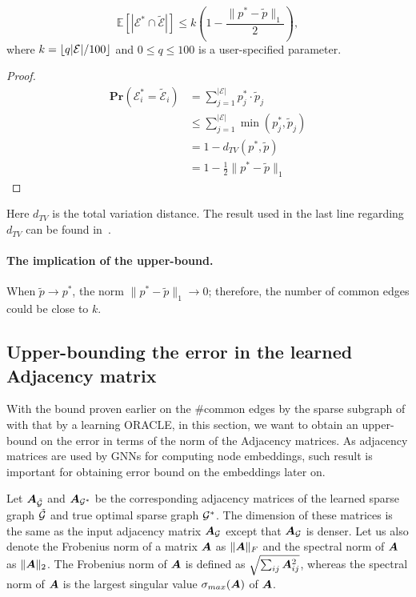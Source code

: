 \begin{theorem}
\begin{equation}
\mathbb{E}[|\mathcal{E}^* \cap \mathcal{\tilde{E}}|] \leq k (1 - \frac{\|p^* - \tilde{p}\|_1}{2}), 
\end{equation}
where $k = \lfloor q|\mathcal{E}|/100 \rfloor$ and $0 \leq q \leq 100$ is a user-specified parameter.
\end{theorem}
\begin{proof}
\begin{align*}
    \mathbf{Pr}(\mathcal{E}_i^* = \mathcal{\tilde{E}}_i) &= \sum_{j=1}^{|\mathcal{E}|} p^*_j \cdot \tilde{p}_j \\
    & \leq \sum_{j=1}^{|\mathcal{E}|} \min(p^*_j,\tilde{p}_j) \\
    &= 1 - d_{TV}(p^*,\tilde{p}) \\
    &= 1 - \frac{1}{2} \|p^* - \tilde{p}\|_1    
\end{align*}
\end{proof}
Here $d_{TV}$ is the total variation distance. The result used in the last line regarding $d_{TV}$ can be found in~\citet{xie2024distributionally}. 

\paragraph{The implication of the upper-bound.} 
When $\tilde{p} \rightarrow p^*$, the norm $\|p^* - \tilde{p}\|_1 \rightarrow 0$; therefore, the number of common edges could be close to $k$.

\subsection{Upper-bounding the error in the learned Adjacency matrix} 
With the bound proven earlier on the \#common edges by the sparse subgraph of \sgs with that by a learning ORACLE, in this section, we want to obtain an upper-bound on the error in terms of the norm of the Adjacency matrices. As adjacency matrices are used by GNNs for computing node embeddings, such result is important for obtaining error bound on the embeddings later on.

Let ${\bm{A}}_{\tilde{{\mathcal{G}}}}$ and ${\bm{A}}_{{\mathcal{G}}^*}$ be the corresponding adjacency matrices of the learned sparse graph $\tilde{{\mathcal{G}}}$ and true optimal sparse graph ${\mathcal{G}}^*$. The dimension of these matrices is the same as the input adjacency matrix ${\bm{A}}_{\mathcal{G}}$ except that ${\bm{A}}_{\mathcal{G}}$ is denser. Let us also denote the Frobenius norm of a matrix ${\bm{A}}$ as $\|{\bm{A}}\|_F$ and the spectral norm of ${\bm{A}}$ as $\|{\bm{A}}\|_2$. The Frobenius norm of ${\bm{A}}$ is defined as $\sqrt{\sum_{ij} {\bm{A}}^2_{ij}}$, whereas the spectral norm of ${\bm{A}}$ is the largest singular value $\sigma_{max}({\bm{A}})$ of ${\bm{A}}$.


